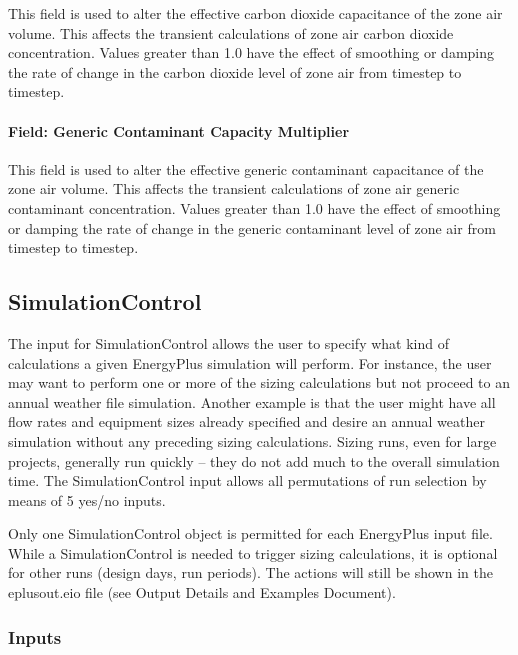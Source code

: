 This field is used to alter the effective carbon dioxide capacitance of the zone air volume. This affects the transient calculations of zone air carbon dioxide concentration. Values greater than 1.0 have the effect of smoothing or damping the rate of change in the carbon dioxide level of zone air from timestep to timestep.

\paragraph{Field: Generic Contaminant Capacity Multiplier}\label{field-generic-contaminant-capacity-multiplier}

This field is used to alter the effective generic contaminant capacitance of the zone air volume. This affects the transient calculations of zone air generic contaminant concentration. Values greater than 1.0 have the effect of smoothing or damping the rate of change in the generic contaminant level of zone air from timestep to timestep.

\subsection{SimulationControl}\label{simulationcontrol}

The input for SimulationControl allows the user to specify what kind of calculations a given EnergyPlus simulation will perform. For instance, the user may want to perform one or more of the sizing calculations but not proceed to an annual weather file simulation. Another example is that the user might have all flow rates and equipment sizes already specified and desire an annual weather simulation without any preceding sizing calculations. Sizing runs, even for large projects, generally run quickly -- they do not add much to the overall simulation time. The SimulationControl input allows all permutations of run selection by means of 5 yes/no inputs.

\begin{callout}
    Only one SimulationControl object is permitted for each EnergyPlus input file. While a SimulationControl is needed to trigger sizing calculations, it is optional for other runs (design days, run periods). The actions will still be shown in the eplusout.eio file (see Output Details and Examples Document).
\end{callout}

\subsubsection{Inputs}\label{inputs-15-014}

